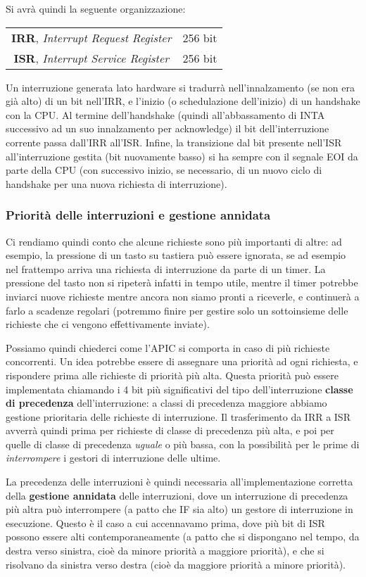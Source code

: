 \documentclass[a4paper,11pt]{article}
\begin{document}
\newpage

Si avrà quindi la seguente organizzazione:
\begin{table}[h!]
	\center 
	\begin{tabular} { c | c  }
		\textbf{IRR}, \textit{Interrupt Request Register} & 256 bit \\
		\textbf{ISR}, \textit{Interrupt Service Register} & 256 bit
	\end{tabular}
\end{table}

Un interruzione generata lato hardware si tradurrà nell'innalzamento (se non era già alto) di un bit nell'IRR, e l'inizio (o schedulazione dell'inizio) di un handshake con la CPU.
Al termine dell'handshake (quindi all'abbassamento di INTA successivo ad un suo innalzamento per acknowledge) il bit dell'interruzione corrente passa dall'IRR all'ISR.
Infine, la transizione dal bit presente nell'ISR all'interruzione gestita (bit nuovamente basso) si ha sempre con il segnale EOI da parte della CPU (con successivo inizio, se necessario, di un nuovo ciclo di handshake per una nuova richiesta di interruzione).

\subsubsection{Priorità delle interruzioni e gestione annidata}
Ci rendiamo quindi conto che alcune richieste sono più importanti di altre: ad esempio, la pressione di un tasto su tastiera può essere ignorata, se ad esempio nel frattempo arriva una richiesta di interruzione da parte di un timer.
La pressione del tasto non si ripeterà infatti in tempo utile, mentre il timer potrebbe inviarci nuove richieste mentre ancora non siamo pronti a riceverle, e continuerà a farlo a scadenze regolari (potremmo finire per gestire solo un sottoinsieme delle richieste che ci vengono effettivamente inviate).

Possiamo quindi chiederci come l'APIC si comporta in caso di più richieste concorrenti.
Un idea potrebbe essere di assegnare una priorità ad ogni richiesta, e rispondere prima alle richieste di priorità più alta.
Questa priorità può essere implementata chiamando i 4 bit più significativi del tipo dell'interruzione \textbf{classe di precedenza} dell'interruzione: a classi di precedenza maggiore abbiamo gestione prioritaria delle richieste di interruzione.
Il trasferimento da IRR a ISR avverrà quindi prima per richieste di classe di precedenza più alta, e poi per quelle di classe di precedenza \textit{uguale} o più bassa, con la possibilità per le prime di \textit{interrompere} i gestori di interruzione delle ultime.

La precedenza delle interruzioni è quindi necessaria all'implementazione corretta della \textbf{gestione annidata} delle interruzioni, dove un interruzione di precedenza più altra può interrompere (a patto che IF sia alto) un gestore di interruzione in esecuzione. 
Questo è il caso a cui accennavamo prima, dove più bit di ISR possono essere alti contemporaneamente (a patto che si dispongano nel tempo, da destra verso sinistra, cioè da minore priorità a maggiore priorità), e che si risolvano da sinistra verso destra (cioè da maggiore priorità a minore priorità).
\end{document}
